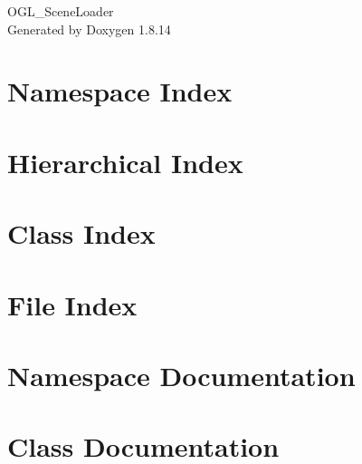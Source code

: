 \documentclass[twoside]{book}
\newcommand{\+}{\discretionary{\mbox{\scriptsize$\hookleftarrow$}}{}{}}
\newcommand{\clearemptydoublepage}{%
  \newpage{\pagestyle{empty}\cleardoublepage}%
}
\begin{document}
\hypersetup{pageanchor=false,
             bookmarksnumbered=true,
             pdfencoding=unicode
            }
\begin{titlepage}
\vspace*{7cm}
\begin{center}%
{\Large O\+G\+L\+\_\+\+Scene\+Loader }\\
\vspace*{1cm}
{\large Generated by Doxygen 1.8.14}\\
\end{center}
\end{titlepage}
\clearemptydoublepage
{}
\tableofcontents
\clearemptydoublepage
{}
\hypersetup{pageanchor=true}

\chapter{Namespace Index}

\chapter{Hierarchical Index}

\chapter{Class Index}

\chapter{File Index}

\chapter{Namespace Documentation}


\chapter{Class Documentation}





















\end{document}
